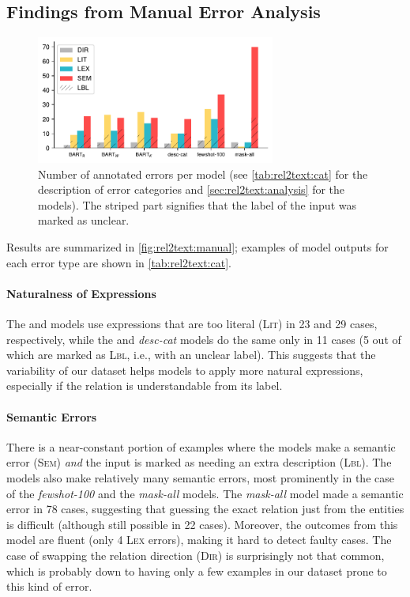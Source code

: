 \subsection{Findings from Manual Error Analysis}


\begin{figure}[t]
    \centering
    \includegraphics[width=0.7\textwidth]{img/rel2text-graph.pdf}
    \caption[Manually annotated errors per model.]{Number of annotated errors per model (see \autoref{tab:rel2text:cat} for the description of error categories and \autoref{sec:rel2text:analysis} for the models). The striped part signifies that the label of the input was marked as unclear.}
    \label{fig:rel2text:manual}
\end{figure}
Results are summarized in \autoref{fig:rel2text:manual}; examples of model outputs for each error type are shown in \autoref{tab:rel2text:cat}.

\paragraph{Naturalness of Expressions} The \BARTk{} and \BARTw{} models use expressions that are too literal (\textsc{Lit}) in 23 and 29 cases, respectively, while the \BARTr{} and \textit{desc-cat} models do the same only in 11 cases (5 out of which are marked as \textsc{Lbl}, i.e., with an unclear label). This suggests that the variability of our dataset helps models to apply more natural expressions, especially if the relation is understandable from its label.

\paragraph{Semantic Errors} There is a near-constant portion of examples where the models make a semantic error (\textsc{Sem}) \textit{and} the input is marked as needing an extra description (\textsc{Lbl}). The models also make relatively many semantic errors, most prominently in the case of the \textit{fewshot-100} and the \textit{mask-all} models. The \textit{mask-all} model made a semantic error in 78 cases, suggesting that guessing the exact relation just from the entities is difficult (although still possible in 22 cases). Moreover, the outcomes from this model are fluent (only 4 \textsc{Lex} errors), making it hard to detect faulty cases.
The case of swapping the relation direction (\textsc{Dir}) is surprisingly not that common, which is probably down to having only a few examples in our dataset prone to this kind of error.

